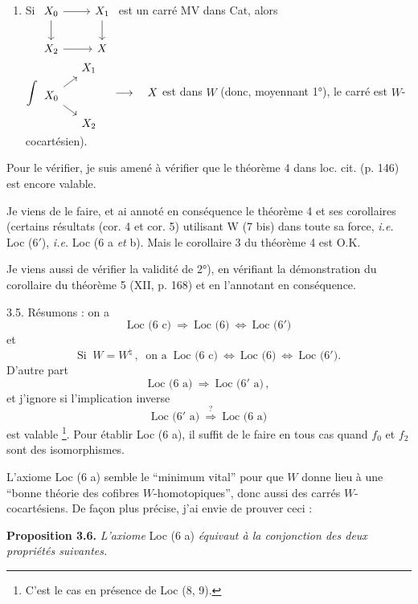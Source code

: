 \begin{enumerate}
\item[1° bis)] Si
$\begin{tikzcd}[ampersand replacement=\&, baseline=(\tikzcdmatrixname-1-1.base)]
X_0 \arrow[r] \arrow[d] \& X_1 \arrow[d] \\
X_2 \arrow[r] \& X
\end{tikzcd}$
est un carré MV dans Cat, alors
$\displaystyle\int
\begin{tikzcd}[ampersand replacement=\&, row sep=small, column sep=small]
\& X_1 \\
X_0 \arrow[ur] \arrow[dr] \& \\
\& X_2
\end{tikzcd}
\quad \longrightarrow \quad X$ est dans $W$ (donc, moyennant 1°), le carré est $W$-cocartésien).
\end{enumerate}

Pour le vérifier, je suis amené à vérifier que le théorème 4 dans loc. cit. (p. 146) est encore valable.

Je viens de le faire, et ai annoté en conséquence le théorème 4 et ses corollaires (certains résultats (cor. 4 et cor. 5) utilisant W (7 bis) dans toute sa force, \textit{i.e.} Loc (6$'$), \textit{i.e.} Loc (6 a \textit{et} b). Mais le corollaire 3 du théorème 4 est O.K.

Je viens aussi de vérifier la validité de 2°), en vérifiant la démonstration du corollaire du théorème 5 (XII, p. 168) et en l'annotant en conséquence.

3.5. Résumons : on a
\[
\text{Loc (6 c)} \ \Longrightarrow \ \text{Loc (6)} \ \iff \ \text{Loc (6$'$)}
\tag*{(3.5.1)}
\]
et
\[
\text{Si } \ W = W^{\natural}\,, \ \text{ on a } \ \text{Loc (6 c)} \ \iff \ \text{Loc (6)} \ \iff \ \text{Loc (6$'$)}.
\tag*{(3.5.2)}
\]
D'autre part
\[
\text{Loc (6 a)} \ \Longrightarrow \ \text{Loc (6$'$ a)}\,,
\tag*{(3.5.3)}
\]
et j'ignore si l'implication inverse
\[
\text{Loc (6$'$ a)} \ \overset{?}{\Longrightarrow} \ \text{Loc (6 a)}
\]
est valable \footnote[18]{C'est le cas en présence de Loc (8, 9).}. Pour établir Loc (6 a), il suffit de le faire en tous cas quand $f_0$ et $f_2$ sont des isomorphismes.

L'axiome Loc (6 a) semble le “minimum vital” pour que $W$ donne lieu à une “bonne théorie des cofibres $W$-homotopiques”, donc aussi des carrés $W$-cocartésiens. De façon plus précise, j'ai envie de prouver ceci :

\textbf{Proposition 3.6.} \textit{L'axiome} Loc (6 a) \textit{équivaut à la conjonction des deux propriétés suivantes.}


